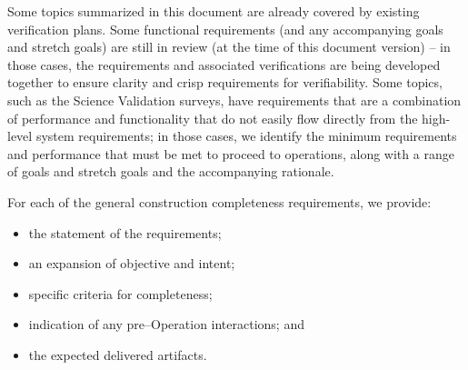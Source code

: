 Some topics summarized in this document are already covered by existing verification plans.
Some functional requirements (and any accompanying goals and stretch goals) are still in review (at the time of this document version) -- in those cases, the requirements and associated verifications are being developed together to ensure clarity and crisp requirements for verifiability.
Some topics, such as the Science Validation surveys, have requirements that are a combination of performance and functionality that do not easily flow directly from the high-level system requirements; in those cases, we identify the minimum requirements and performance that must be met to proceed to operations, along with a range of goals and stretch goals and the accompanying rationale.

For each of the general construction completeness requirements, we provide:

\begin{itemize}
	\item the statement of the requirements;
	\item an expansion of objective and intent;
	\item specific criteria for completeness;
	\item indication of any pre--Operation interactions; and
	\item the expected delivered artifacts.
\end{itemize}
